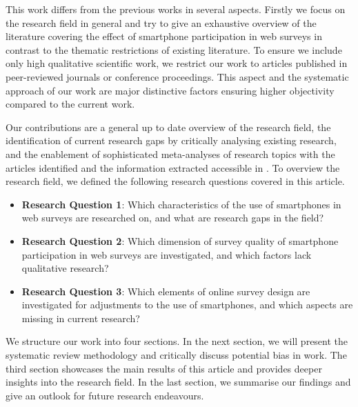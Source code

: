 This work differs from the previous works in several aspects. Firstly we focus on the research field in general and try to give an exhaustive overview of the literature covering the effect of smartphone participation in web surveys in contrast to the thematic restrictions of existing literature. To ensure we include only high qualitative scientific work, we restrict our work to articles published in peer-reviewed journals or conference proceedings. This aspect and the systematic approach of our work are major distinctive factors ensuring higher objectivity compared to the current work.  

Our contributions are a general up to date overview of the research field, the identification of current research gaps by critically analysing existing research, and the enablement of sophisticated meta-analyses of research topics with the articles identified and the information extracted accessible in \cite{langenbahn_smartphone_2021}. To overview the research field, we defined the following research questions covered in this article.

\begin{itemize}
   \item \textbf{Research Question 1}: Which characteristics of the use of smartphones in web surveys are researched on, and what are research gaps in the field? 
   \item \textbf{Research Question 2}: Which dimension of survey quality of smartphone participation in web surveys are investigated, and which factors lack qualitative research?
   \item \textbf{Research Question 3}: Which elements of online survey design are investigated for adjustments to the use of smartphones, and which aspects are missing in current research?
\end{itemize}

We structure our work into four sections. In the next section, we will present the systematic review methodology and critically discuss potential bias in work. The third section showcases the main results of this article and provides deeper insights into the research field. In the last section, we summarise our findings and give an outlook for future research endeavours. 




